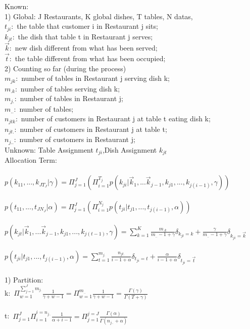 \documentclass{article}
\begin{document}
\begin{spacing}{1.1}
Known: \\
1) Global: J Restaurants, K global dishes, T tables, N datas,\\
$t_{ji}:$ the table that customer i in Restaurant j sits;\\
$k_{jt}:$ the dish that table t in Restaurant j serves;\\
$\vec k:$ new dish different from what has been served;\\
$\vec t:$ the table different from what has been occupied;\\
2) Counting so far (during the process)\\
$m_{jk}:$ number of tables in Restaurant j serving dish k;\\
$m_{.k}:$ number of tables serving dish k;\\
$m_{j.}:$ number of tables in Restaurant j;\\
$m_{..}:$ number of tables;\\
$n_{jtk}:$ number of customers in Restaurant j at table t eating dish k;\\
$n_{jt.}:$ number of customers in Restaurant j at table t;\\
$n_{j..}:$ number of customers in Restaurant j;\\

Unknown: Table Assignment $t_{ji}$,Dish Assignment $k_{jt}$\\ 
Allocation Term: \\ \\
$p(k_{11},...,k_{JT_{J}}|\gamma)=\Pi_{j=1}^{J}(\Pi_{i=1}^{T_{j}}p(k_{ji}|\vec k_{1},...\vec k_{j-1},k_{j1},...,k_{j(i-1)},\gamma))$\\ \\
$p(t_{11},...,t_{JN_{J}}|\alpha)=\Pi_{j=1}^{J}(\Pi_{i=1}^{N_{j}}p(t_{ji}|t_{j1},...,t_{j(i-1)},\alpha))$\\ \\
$p(k_{jt}|\vec k_{1},...\vec k_{j-1},k_{j1},...,k_{j(t-1)},\gamma)=\sum_{k=1}^{K}\frac{m_{.k}}{m_{..}-1+\gamma}\delta_{k_{jt}=k}+\frac{\gamma}{m_{..}-1+\gamma}\delta_{k_{ji}=\vec k}$\\ \\
$p(t_{ji}|t_{j1},...,t_{j(i-1)},\alpha)=\sum_{t=1}^{m_{j.}}\frac{n_{jt.}}{i-1+\alpha}\delta_{t_{ji}=t}+\frac{\alpha}{i-1+\alpha}\delta_{t_{ji}=\vec t}$\\ \\

1) Partition:\\
k:\ $\Pi_{w=1}^{\sum_{j=1}^{J}m_{j.}}\frac{1}{\gamma+w-1}=\Pi_{w=1}^{m_{..}}\frac{1}{\gamma+w-1}=\frac{\Gamma(\gamma)}{\Gamma(T+\gamma)}$\\ \\
t:\ $\Pi_{j=1}^{J}\Pi_{i=1}^{i=n_{j..}}\frac{1}{\alpha+i-1}=\Pi_{j=1}^{j=J}\frac{\Gamma(\alpha)}{\Gamma(n_{j..}+\alpha)}$\\ \\


\end{spacing}
\end{document}
